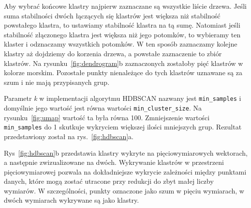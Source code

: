 	Aby wybrać końcowe klastry najpierw zaznaczane są wszystkie liście drzewa.
	Jeśli suma stabilności dwóch łączących się klastrów jest większa niż stabilność powstałego klastra, 
		to ustawiamy stabilność klastra na tą sumę.
	Natomiast jeśli stabilność złączonego klastra jest większa niż jego potomków, to wybieramy ten klaster i odznaczamy wszystkich potomków.
	W ten sposób zaznaczamy kolejne klastry aż dojdziemy do korzenia drzewa, a powstałe zaznaczenie to zbiór klastrów.
	Na rysunku~\ref{fig:dendrogram}b zaznaczonych zostałoby pięć klastrów w kolorze morskim.
	Pozostałe punkty nienależące do tych klastrów uznawane są za szum i nie mają przypisanych grup.

	Parametr \emph{k} w implementacji algorytmu HDBSCAN nazwany jest \verb|min_samples| 
		i domyślnie jego wartość jest równa wartości \verb|min_cluster_size|.
	Na rysunku~\ref{fig:umap} wartość ta była równa 100.
	Zmniejszenie wartości \verb|min_samples| do 1 skutkuje wykryciem większej ilości mniejszych grup.
	Rezultat przedstawiony został na rys.~\ref{fig:hdbscan}a.

	Rys~\ref{fig:hdbscan}b przedstawia klastry wykryte na pięciowymiarowych wektorach, a następnie zwizualizowane na dwóch.
	Wykrywanie klastrów w przestrzeni pięciowymiarowej pozwala na dokładniejsze wykrycie zależności między punktami danych,
		które mogą zostać utracone przy redukcji do zbyt małej liczby wymiarów.
	W szczególności, punkty oznaczone jako szum w pięciu wymiarach, w dwóch wymiarach wykrywane są jako klastry.
	
